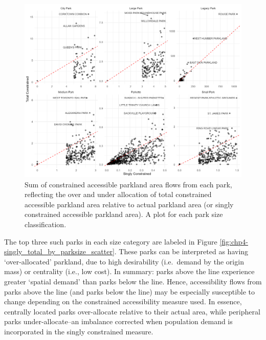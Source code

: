 \documentclass[
11pt, %
oneside, %
english, %
singlespacing, %
]{macthesis} %
\begin{document}
\begin{figure}

{\centering \includegraphics[width=6in]{./data/figures/chp4-singly_total_by_parksize_scatter} 

}

\caption{\label{fig:chp4-singly_total_by_parksize_scatter} Sum of constrained accessible parkland area flows from each park, reflecting the over and under allocation of total constrained accessible parkland area relative to actual parkland area (or singly constrained accessible parkland area). A plot for each park size classification.}\label{fig:unnamed-chunk-57}
\end{figure}

The top three such parks in each size category are labeled in Figure \ref{fig:chp4-singly_total_by_parksize_scatter}. These parks can be interpreted as having `over-allocated' parkland, due to high desirability (i.e.~demand by the origin mass) or centrality (i.e., low cost). In summary: parks above the line experience greater `spatial demand' than parks below the line. Hence, accessibility flows from parks above the line (and parks below the line) may be especially susceptible to change depending on the constrained accessibility measure used. In essence, centrally located parks over-allocate relative to their actual area, while peripheral parks under-allocate--an imbalance corrected when population demand is incorporated in the singly constrained measure.
\end{document}
